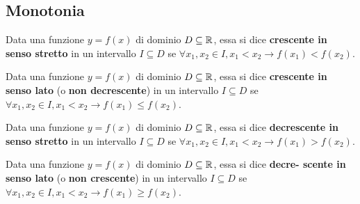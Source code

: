 \documentclass{article}     %
\begin{document}
    \subsection{Monotonia}
        \begin{definition}
            Data una funzione $y=f(x)$ di dominio $D\subseteq \mathbb{R}$, essa si dice \textbf{crescente in senso stretto} in un intervallo $I\subseteq D$ se $\forall x_1,x_2 \in I, x_1 <x_2 \rightarrow f(x_1)<f(x_2)$.
        \end{definition}
        \begin{definition}
            Data una funzione $y=f(x)$ di dominio $D\subseteq \mathbb{R}$, essa si dice \textbf{crescente in senso lato} (o \textbf{non decrescente}) in un intervallo $I\subseteq D$ se $\forall x_1,x_2 \in I, x_1 <x_2 \rightarrow f(x_1)\leq f(x_2)$.
        \end{definition}
        \begin{definition}
            Data una funzione $y=f(x)$ di dominio $D\subseteq \mathbb{R}$, essa si dice \textbf{decrescente in senso stretto} in un intervallo $I\subseteq D$ se $\forall x_1,x_2 \in I, x_1 <x_2 \rightarrow f(x_1)>f(x_2)$.
        \end{definition}
        \begin{definition}
            Data una funzione $y=f(x)$ di dominio $D\subseteq \mathbb{R}$, essa si dice \textbf{decre- scente in senso lato} (o \textbf{non crescente}) in un intervallo $I\subseteq D$ se $\forall x_1,x_2 \in I, x_1 <x_2 \rightarrow f(x_1)\geq f(x_2)$. 
        \end{definition}
        \begin{ex}
        \end{ex}
        \begin{wrapfigure}[9]{r}{0.40\textwidth}
            \begin{center}
            \end{center}
        \end{wrapfigure}
\end{document}
